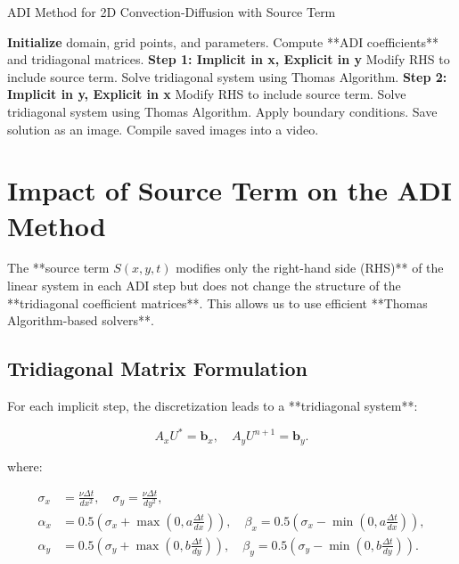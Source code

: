 \documentclass{article}
\begin{document}
\begin{algorithm}[H]
\caption{ADI Method for 2D Convection-Diffusion with Source Term}
\begin{algorithmic}[1]
\State \textbf{Initialize} domain, grid points, and parameters.
\State Compute **ADI coefficients** and tridiagonal matrices.
    \State \textbf{Step 1: Implicit in x, Explicit in y}
        \State Modify RHS to include source term.
        \State Solve tridiagonal system using Thomas Algorithm.
    \EndFor
    \State \textbf{Step 2: Implicit in y, Explicit in x}
        \State Modify RHS to include source term.
        \State Solve tridiagonal system using Thomas Algorithm.
    \EndFor
    \State Apply boundary conditions.
    \State Save solution as an image.
\EndFor
\State Compile saved images into a video.
\end{algorithmic}
\end{algorithm}

\section{Impact of Source Term on the ADI Method}
The **source term \( S(x,y,t) \) modifies only the right-hand side (RHS)** of the linear system in each ADI step but does not change the structure of the **tridiagonal coefficient matrices**. This allows us to use efficient **Thomas Algorithm-based solvers**.

\subsection{Tridiagonal Matrix Formulation}
For each implicit step, the discretization leads to a **tridiagonal system**:

\begin{equation}
    A_x U^* = \mathbf{b}_x, \quad A_y U^{n+1} = \mathbf{b}_y.
\end{equation}

where:

\begin{align*}
\sigma_x &= \frac{\nu \Delta t}{dx^2}, \quad \sigma_y = \frac{\nu \Delta t}{dy^2}, \\
\alpha_x &= 0.5 \left(\sigma_x + \max(0, a \frac{\Delta t}{dx}) \right), \quad
\beta_x = 0.5 \left(\sigma_x - \min(0, a \frac{\Delta t}{dx}) \right), \\
\alpha_y &= 0.5 \left(\sigma_y + \max(0, b \frac{\Delta t}{dy}) \right), \quad
\beta_y = 0.5 \left(\sigma_y - \min(0, b \frac{\Delta t}{dy}) \right).
\end{align*}
\end{document}
